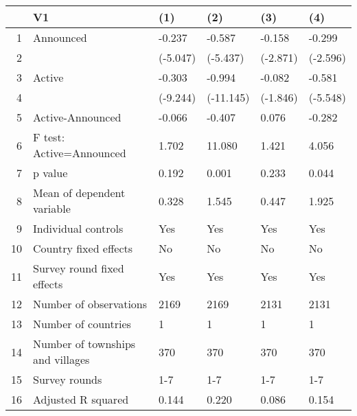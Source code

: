 \begin{table}[ht]
\centering
\begin{tabular}{rlllll}
  \hline
 & V1 & (1) & (2) & (3) & (4) \\ 
  \hline
1 & Announced & -0.237 & -0.587 & -0.158 & -0.299 \\ 
  2 &  & (-5.047) & (-5.437) & (-2.871) & (-2.596) \\ 
  3 & Active & -0.303 & -0.994 & -0.082 & -0.581 \\ 
  4 &  & (-9.244) & (-11.145) & (-1.846) & (-5.548) \\ 
  5 & Active-Announced & -0.066 & -0.407 & 0.076 & -0.282 \\ 
  6 & F test: Active=Announced & 1.702 & 11.080 & 1.421 & 4.056 \\ 
  7 & p value & 0.192 & 0.001 & 0.233 & 0.044 \\ 
  8 & Mean of dependent variable & 0.328 & 1.545 & 0.447 & 1.925 \\ 
  9 & Individual controls & Yes & Yes & Yes & Yes \\ 
  10 & Country fixed effects & No & No & No & No \\ 
  11 & Survey round fixed effects & Yes & Yes & Yes & Yes \\ 
  12 & Number of observations & 2169 & 2169 & 2131 & 2131 \\ 
  13 & Number of countries & 1 & 1 & 1 & 1 \\ 
  14 & Number of townships and villages & 370 & 370 & 370 & 370 \\ 
  15 & Survey rounds & 1-7 & 1-7 & 1-7 & 1-7 \\ 
  16 & Adjusted R squared & 0.144 & 0.220 & 0.086 & 0.154 \\ 
   \hline
\end{tabular}
\end{table}
